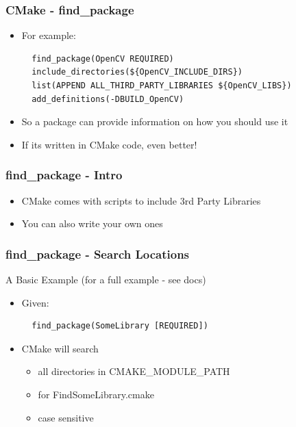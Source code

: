 \subsubsection{CMake - find\_package}\label{cmake---findux5fpackage}

\begin{itemize}
\item
  For example:

\begin{verbatim}
  find_package(OpenCV REQUIRED)
  include_directories(${OpenCV_INCLUDE_DIRS})
  list(APPEND ALL_THIRD_PARTY_LIBRARIES ${OpenCV_LIBS})
  add_definitions(-DBUILD_OpenCV)
\end{verbatim}
\item
  So a package can provide information on how you should use it
\item
  If its written in CMake code, even better!
\end{itemize}

\subsubsection{find\_package - Intro}\label{findux5fpackage---intro}

\begin{itemize}
\itemsep1pt\parskip0pt
\item
  CMake comes with scripts to include 3rd Party Libraries
\item
  You can also write your own ones
\end{itemize}

\subsubsection{find\_package - Search
Locations}\label{findux5fpackage---search-locations}

A Basic Example (for a full example - see docs)

\begin{itemize}
\item
  Given:

\begin{verbatim}
  find_package(SomeLibrary [REQUIRED])
\end{verbatim}
\item
  CMake will search

  \begin{itemize}
  \itemsep1pt\parskip0pt
  \item
    all directories in CMAKE\_MODULE\_PATH
  \item
    for FindSomeLibrary.cmake
  \item
    case sensitive
  \end{itemize}
\end{itemize}

